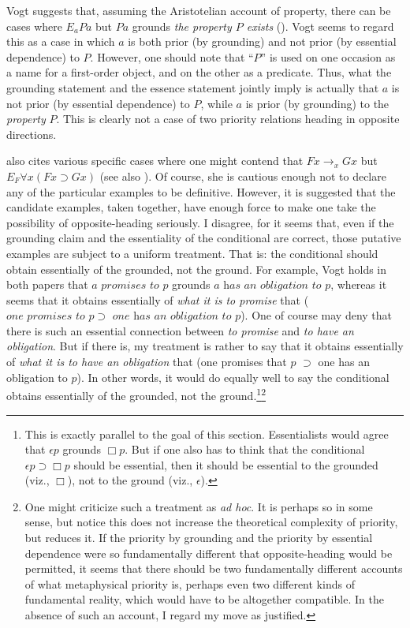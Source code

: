 \documentclass[12pt]{article}
\begin{document}
\par
Vogt suggests that, assuming the Aristotelian account of property, there can be cases where $E_a Pa$ but $Pa$ grounds \textit{the property $P$ exists} (\citeyear[519]{Vogt2026-VOGDAD-2}). Vogt seems to regard this as a case in which $a$ is both prior (by grounding) and not prior (by essential dependence) to $P$. However, one should note that ``$P$'' is used on one occasion as a name for a first-order object, and on the other as a predicate. Thus, what the grounding statement and the essence statement jointly imply is actually that $a$ is not prior (by essential dependence) to $P$, while $a$ is prior (by grounding) to the \textit{property} $P$. This is clearly not a case of two priority relations heading in opposite directions. 
\par
\citet{Vogt2026-VOGDAD-2, Vogt2026-VOGUEH} also cites various specific cases where one might contend that $Fx \bm{\rightarrow}_x Gx$ but $E_F \forall x(Fx \supset Gx)$ (see also \citet{Correia2018-CORODG}). Of course, she is cautious enough not to declare any of the particular examples to be definitive. However, it is suggested that the candidate examples, taken together, have enough force to make one take the possibility of opposite-heading seriously. I disagree, for it seems that, even if the grounding claim and the essentiality of the conditional are correct, those putative examples are subject to a uniform treatment. That is: the conditional should obtain essentially of the grounded, not the ground. For example, Vogt holds in both papers that $a \textit{ promises to }p$ grounds $a \textit{ has an obligation to }p$, whereas it seems that it obtains essentially of \textit{what it is to promise} that ($\textit{one promises to }p \supset \textit{ one has an obligation to } p$). One of course may deny that there is such an essential connection between \textit{to promise} and \textit{to have an obligation}. But if there is, my treatment is rather to say that it obtains essentially of \textit{what it is to have an obligation} that (one promises that $p$ $\supset$ one has an obligation to $p$). In other words, it would do equally well to say the conditional obtains essentially of the grounded, not the ground.\footnote{This is exactly parallel to the goal of this section. Essentialists would agree that $\epsilon p$ grounds $\Box p$. But if one also has to think that the conditional $\epsilon p \supset \Box p$ should be essential, then it should be essential to the grounded (viz., $\Box$), not to the ground (viz., $\epsilon$).}\footnote{One might criticize such a treatment as \textit{ad hoc}. It is perhaps so in some sense, but notice this does not increase the theoretical complexity of priority, but reduces it. If the priority by grounding and the priority by essential dependence were so fundamentally different that opposite-heading would be permitted, it seems that there should be two fundamentally different accounts of what metaphysical priority is, perhaps even two different kinds of fundamental reality, which would have to be altogether compatible. In the absence of such an account, I regard my move as justified.} 
\end{document}
